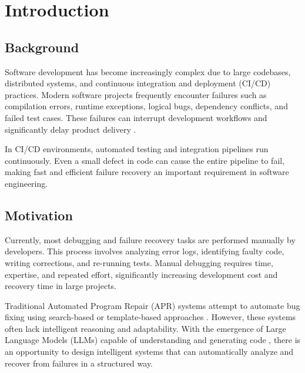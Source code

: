 \documentclass[conference]{IEEEtran}
\begin{document}
\section{Introduction}

\subsection{Background}
Software development has become increasingly complex due to large codebases, distributed systems, and continuous integration and deployment (CI/CD) practices. Modern software projects frequently encounter failures such as compilation errors, runtime exceptions, logical bugs, dependency conflicts, and failed test cases. These failures can interrupt development workflows and significantly delay product delivery \cite{genprog}.

In CI/CD environments, automated testing and integration pipelines run continuously. Even a small defect in code can cause the entire pipeline to fail, making fast and efficient failure recovery an important requirement in software engineering.

\subsection{Motivation}
Currently, most debugging and failure recovery tasks are performed manually by developers. This process involves analyzing error logs, identifying faulty code, writing corrections, and re-running tests. Manual debugging requires time, expertise, and repeated effort, significantly increasing development cost and recovery time in large projects.

Traditional Automated Program Repair (APR) systems attempt to automate bug fixing using search-based or template-based approaches \cite{genprog, templateapr}. However, these systems often lack intelligent reasoning and adaptability. With the emergence of Large Language Models (LLMs) capable of understanding and generating code \cite{codex, gemini}, there is an opportunity to design intelligent systems that can automatically analyze and recover from failures in a structured way.
\end{document}
